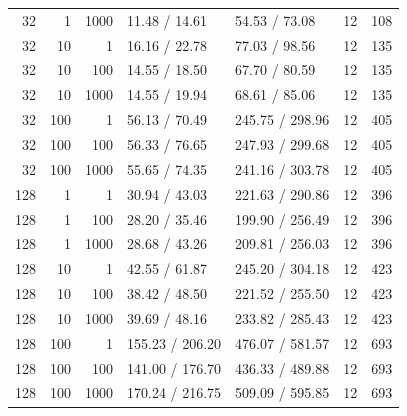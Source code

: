 \begin{longtable}{@{}rrrllrr@{}}
32 & 1 & 1000 & 11.48 / 14.61 & 54.53 / 73.08 & 12 & 108 \\
32 & 10 & 1 & 16.16 / 22.78 & 77.03 / 98.56 & 12 & 135 \\
32 & 10 & 100 & 14.55 / 18.50 & 67.70 / 80.59 & 12 & 135 \\
32 & 10 & 1000 & 14.55 / 19.94 & 68.61 / 85.06 & 12 & 135 \\
32 & 100 & 1 & 56.13 / 70.49 & 245.75 / 298.96 & 12 & 405 \\
32 & 100 & 100 & 56.33 / 76.65 & 247.93 / 299.68 & 12 & 405 \\
32 & 100 & 1000 & 55.65 / 74.35 & 241.16 / 303.78 & 12 & 405 \\
128 & 1 & 1 & 30.94 / 43.03 & 221.63 / 290.86 & 12 & 396 \\
128 & 1 & 100 & 28.20 / 35.46 & 199.90 / 256.49 & 12 & 396 \\
128 & 1 & 1000 & 28.68 / 43.26 & 209.81 / 256.03 & 12 & 396 \\
128 & 10 & 1 & 42.55 / 61.87 & 245.20 / 304.18 & 12 & 423 \\
128 & 10 & 100 & 38.42 / 48.50 & 221.52 / 255.50 & 12 & 423 \\
128 & 10 & 1000 & 39.69 / 48.16 & 233.82 / 285.43 & 12 & 423 \\
128 & 100 & 1 & 155.23 / 206.20 & 476.07 / 581.57 & 12 & 693 \\
128 & 100 & 100 & 141.00 / 176.70 & 436.33 / 489.88 & 12 & 693 \\
128 & 100 & 1000 & 170.24 / 216.75 & 509.09 / 595.85 & 12 & 693 \\
\end{longtable}
\endgroup
